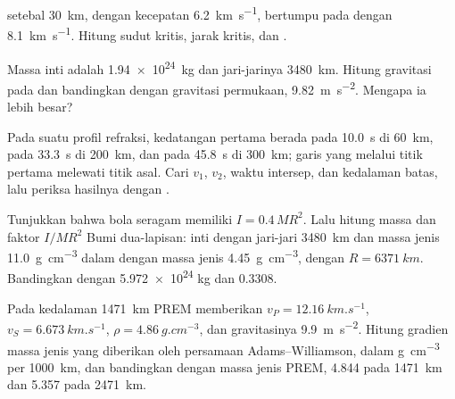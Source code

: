 \begin{exercise}[$\star$]\label{exo:b1:layered-earth:3}
 setebal \qty{30}{km}, dengan kecepatan \qty{6.2}{km.s^{-1}}, bertumpu pada  dengan \qty{8.1}{km.s^{-1}}. Hitung sudut kritis, jarak kritis, dan .
\end{exercise}

\begin{exercise}[$\star$]\label{exo:b1:layered-earth:4}
Massa inti adalah \qty{1.94e24}{kg} dan jari-jarinya \qty{3480}{km}. Hitung gravitasi pada  dan bandingkan dengan gravitasi permukaan, \qty{9.82}{m.s^{-2}}. Mengapa ia lebih besar?
\end{exercise}

\begin{exercise}[$\star\star$]\label{exo:b1:layered-earth:5}
Pada suatu profil refraksi, kedatangan pertama berada pada \qty{10.0}{s} di \qty{60}{km}, pada \qty{33.3}{s} di \qty{200}{km}, dan pada \qty{45.8}{s} di \qty{300}{km}; garis yang melalui titik pertama melewati titik asal. Cari $v_1$, $v_2$, waktu intersep, dan kedalaman batas, lalu periksa hasilnya dengan .
\end{exercise}

\begin{exercise}[$\star\star$]\label{exo:b1:layered-earth:6}
Tunjukkan bahwa bola seragam memiliki $I = 0.4\,MR^2$. Lalu hitung massa dan faktor $I/MR^2$ Bumi dua-lapisan: inti dengan jari-jari \qty{3480}{km} dan massa jenis \qty{11.0}{g.cm^{-3}} dalam  dengan massa jenis \qty{4.45}{g.cm^{-3}}, dengan $R = \qty{6371}{km}$. Bandingkan dengan \num{5.972e24} kg dan $0.3308$.
\end{exercise}

\begin{exercise}[$\star\star$]\label{exo:b1:layered-earth:7}
Pada kedalaman \qty{1471}{km} PREM memberikan $v_P = \qty{12.16}{km.s^{-1}}$, $v_S = \qty{6.673}{km.s^{-1}}$, $\rho = \qty{4.86}{g.cm^{-3}}$, dan gravitasinya \qty{9.9}{m.s^{-2}}. Hitung gradien massa jenis yang diberikan oleh persamaan Adams--Williamson, dalam \unit{g.cm^{-3}} per \qty{1000}{km}, dan bandingkan dengan massa jenis PREM, \num{4.844} pada \qty{1471}{km} dan \num{5.357} pada \qty{2471}{km}.
\end{exercise}

